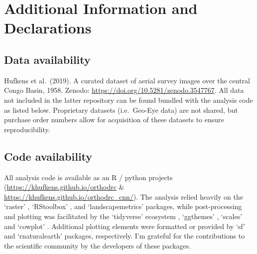 \documentclass[remote sensing,article,submit,moreauthors,pdftex]{mdpi}
\begin{document}
\hypertarget{additional-information-and-declarations}{%
\section{Additional Information and
Declarations}\label{additional-information-and-declarations}}

\hypertarget{data-availability}{%
\subsection{Data availability}\label{data-availability}}

Hufkens et al.~(2019). A curated dataset of aerial survey images over
the central Congo Basin, 1958. Zenodo:
\url{https://doi.org/10.5281/zenodo.3547767}. All data not included in
the latter repository can be found bundled with the analysis code as
listed below. Proprietary datasets (i.e.~Geo-Eye data) are not shared,
but purchase order numbers allow for acquisition of these datasets to
ensure reproducibility.

\hypertarget{code-availability}{%
\subsection{Code availability}\label{code-availability}}

All analysis code is available as an R / python \citep{rcoreteam2019}
projects (\url{https://khufkens.github.io/orthodrc} \&
\url{https://khufkens.github.io/orthodrc_cnn/}). The analysis relied
heavily on the `raster' \citep{hijmans2019}, `RStoolbox'
\citep{leutner2019}, and `landscapemetrics' \citep{hesselbarth2019}
packages, while post-processing and plotting was facilitated by the
`tidyverse' ecosystem \citep{wickham2017}, `ggthemes'
\citep{arnold2019}, `scales' \citep{wickham2018} and `cowplot'
\citep{wilke2019}. Additional plotting elements were formatted or
provided by `sf' \citep{pebesma2018} and `rnaturalearth'
\citep{south2017} packages, respectively. I'm grateful for the
contributions to the scientific community by the developers of these
packages.

%
\end{document}
